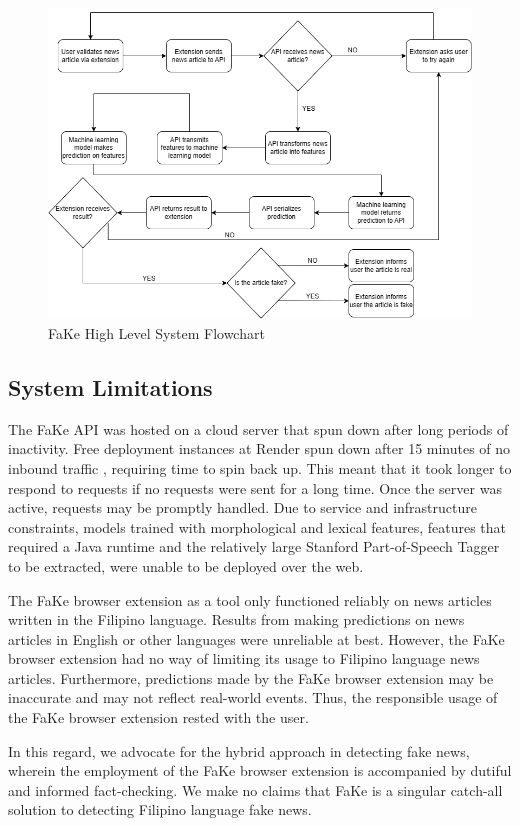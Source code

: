 \begin{figure}[h]
\includegraphics[width=\textwidth,height=\textheight,keepaspectratio]{figures/FakeSystemFlowchart.png}
  \caption{FaKe High Level System Flowchart}
  \label{SystemFlowchart}
\end{figure}
\clearpage

\subsection{System Limitations} \label{extension-limitations}

The FaKe API was hosted on a cloud server that spun down after long periods of inactivity. Free deployment instances at Render spun down after 15 minutes of no inbound traffic \cite{render-docs}, requiring time to spin back up. This meant that it took longer to respond to requests if no requests were sent for a long time. Once the server was active, requests may be promptly handled. Due to service and infrastructure constraints, models trained with morphological and lexical features, features that required a Java runtime and the relatively large Stanford Part-of-Speech Tagger to be extracted, were unable to be deployed over the web.

The FaKe browser extension as a tool only functioned reliably on news articles written in the Filipino language. Results from making predictions on news articles in English or other languages were unreliable at best. However, the FaKe browser extension had no way of limiting its usage to Filipino language news articles. Furthermore, predictions made by the FaKe browser extension may be inaccurate and may not reflect real-world events. Thus, the responsible usage of the FaKe browser extension rested with the user.

In this regard, we advocate for the hybrid approach in detecting fake news, wherein the employment of the FaKe browser extension is accompanied by dutiful and informed fact-checking. We make no claims that FaKe is a singular catch-all solution to detecting Filipino language fake news.